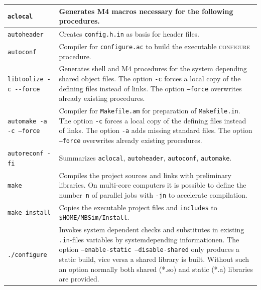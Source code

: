 	\begin{tabular}{|l|p{100mm}|}
	\hline
		\texttt{aclocal} & Generates M4 macros necessary for the following procedures.\\\hline
		\texttt{autoheader} & Creates \texttt{config.h.in} as basis for header files.\\\hline
		\texttt{autoconf} & Compiler for \texttt{configure.ac} to build the executable \textsc{configure} procedure.\\\hline
		\verb|libtoolize -c --force| & Generates shell and M4 procedures for the system depending shared object files. The option \texttt{-c} forces a local copy of the defining files instead of links. The option \texttt{--force} overwrites already existing procedures.\\\hline
		\texttt{automake -a -c --force} & Compiler for \texttt{Makefile.am} for preparation of \texttt{Makefile.in}. The option \texttt{-c} forces a local copy of the defining files instead of links. The option \texttt{-a} adds missing standard files. The option \texttt{--force} overwrites already existing procedures.\\\hline
		\texttt{autoreconf -fi} & Summarizes \texttt{aclocal}, \texttt{autoheader}, \texttt{autoconf}, \texttt{automake}.\\\hline
		\texttt{make} & Compiles the project sources and links with preliminary libraries. On multi-core computers it is possible to define the number~\texttt{n} of parallel jobs with \texttt{-jn} to accelerate compilation.\\\hline
		\texttt{make install} & Copies the executable project files and \texttt{includes} to \texttt{\$HOME/MBSim/Install}.\\\hline 
        \texttt{./configure} & Invokes system dependent checks and substitutes in existing \texttt{.in}-files variables by systemdepending informationen. The option \texttt{--enable-static --disable-shared} only produces a static build, vice versa a shared library is built. Without such an option normally both shared (*.so) and static (*.a) libraries are provided.\\\hline
	\end{tabular}


